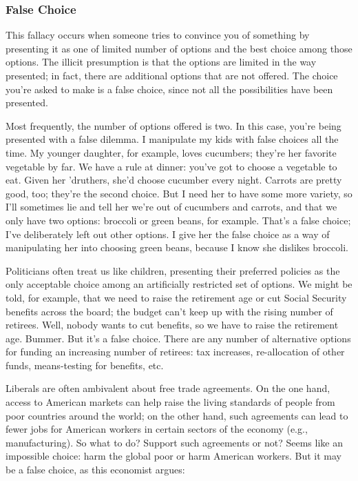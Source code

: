 \subsubsection{False Choice}
This fallacy occurs when someone tries to convince you of something by presenting it as one of
limited number of options and the best choice among those options. The illicit presumption is that
the options are limited in the way presented; in fact, there are additional options that are not
offered. The choice you're asked to make is a false choice, since not all the possibilities have been
presented.

Most frequently, the number of options offered is two. In this case, you're being presented with a
false dilemma. I manipulate my kids with false choices all the time. My younger daughter, for
example, loves cucumbers; they're her favorite vegetable by far. We have a rule at dinner: you've
got to choose a vegetable to eat. Given her 'druthers, she'd choose cucumber every night. Carrots
are pretty good, too; they're the second choice. But I need her to have some more variety, so I'll
sometimes lie and tell her we're out of cucumbers and carrots, and that we only have two options:
broccoli or green beans, for example. That's a false choice; I've deliberately left out other options.
I give her the false choice as a way of manipulating her into choosing green beans, because I know
she dislikes broccoli.

Politicians often treat us like children, presenting their preferred policies as the only acceptable
choice among an artificially restricted set of options. We might be told, for example, that we need
to raise the retirement age or cut Social Security benefits across the board; the budget can't keep
up with the rising number of retirees. Well, nobody wants to cut benefits, so we have to raise the
retirement age. Bummer. But it's a false choice. There are any number of alternative options for
funding an increasing number of retirees: tax increases, re-allocation of other funds, means-testing
for benefits, etc.

Liberals are often ambivalent about free trade agreements. On the one hand, access to American
markets can help raise the living standards of people from poor countries around the world; on the
other hand, such agreements can lead to fewer jobs for American workers in certain sectors of the
economy (e.g., manufacturing). So what to do? Support such agreements or not? Seems like an
impossible choice: harm the global poor or harm American workers. But it may be a false choice,
as this economist argues:

